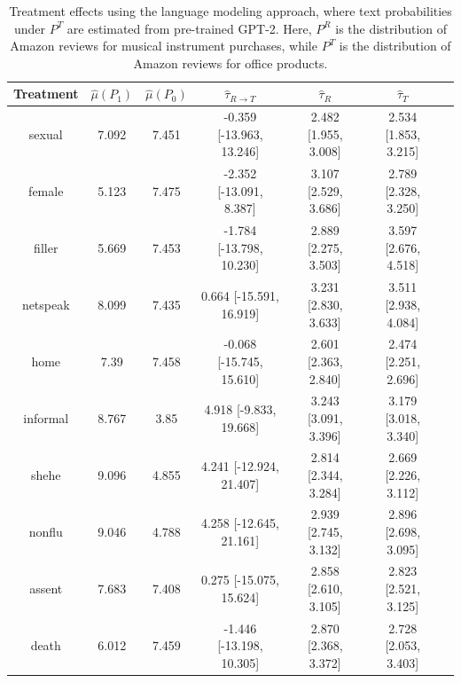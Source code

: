 \documentclass{article}
\begin{document}
\begin{table}[!ht]
    \centering
    \begin{tabular}{c|cccccc}
\toprule
      Treatment &   $\hat{\mu}(P_1)$ &   $\hat{\mu}(P_0)$ & $\hat{\tau}_{R \rightarrow T}$   & $\hat{\tau}_R$       & $\hat{\tau}_T$       \\
\midrule
    sexual   &              7.092 &              7.451 & -0.359 [-13.963, 13.246]         & 2.482 [1.955, 3.008] & 2.534 [1.853, 3.215] \\
    female   &              5.123 &              7.475 & -2.352 [-13.091, 8.387]          & 3.107 [2.529, 3.686] & 2.789 [2.328, 3.250] \\
    filler   &              5.669 &              7.453 & -1.784 [-13.798, 10.230]         & 2.889 [2.275, 3.503] & 3.597 [2.676, 4.518] \\
    netspeak &              8.099 &              7.435 & 0.664 [-15.591, 16.919]          & 3.231 [2.830, 3.633] & 3.511 [2.938, 4.084] \\
    home     &              7.39  &              7.458 & -0.068 [-15.745, 15.610]         & 2.601 [2.363, 2.840] & 2.474 [2.251, 2.696] \\
    informal &              8.767 &              3.85  & 4.918 [-9.833, 19.668]           & 3.243 [3.091, 3.396] & 3.179 [3.018, 3.340] \\
    shehe    &              9.096 &              4.855 & 4.241 [-12.924, 21.407]          & 2.814 [2.344, 3.284] & 2.669 [2.226, 3.112] \\
    nonflu   &              9.046 &              4.788 & 4.258 [-12.645, 21.161]          & 2.939 [2.745, 3.132] & 2.896 [2.698, 3.095] \\
    assent   &              7.683 &              7.408 & 0.275 [-15.075, 15.624]          & 2.858 [2.610, 3.105] & 2.823 [2.521, 3.125] \\
    death    &              6.012 &              7.459 & -1.446 [-13.198, 10.305]         & 2.870 [2.368, 3.372] & 2.728 [2.053, 3.403] \\
\bottomrule
    \end{tabular}
    \caption{Treatment effects using the language modeling approach, where text probabilities under $P^T$ are estimated from pre-trained GPT-2. Here, $P^R$ is the distribution of Amazon reviews for musical instrument purchases, while $P^T$ is the distribution of Amazon reviews for office products.}
    \label{tab:results_clm_gpt2_amazon_synthetic}
\end{table}
\end{document}
